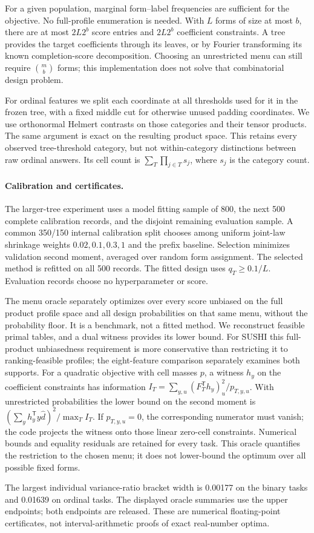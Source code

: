 For a given population, marginal form--label frequencies are sufficient for
the objective. No full-profile enumeration is needed. With $L$ forms of
size at most $b$, there are at most $2L2^b$ score entries and $2L2^b$
coefficient constraints. A tree provides the target coefficients through
its leaves, or by Fourier transforming its known completion-score
decomposition. Choosing an unrestricted menu can still require
$\binom mb$ forms; this implementation does not solve that combinatorial
design problem.

For ordinal features we split each coordinate at all thresholds used for it
in the frozen tree, with a fixed middle cut for otherwise unused padding
coordinates. We use orthonormal Helmert contrasts on those categories and
their tensor products. The same argument is exact on the resulting product
space. This retains every observed tree-threshold category, but not
within-category distinctions between raw ordinal answers. Its cell count
is $\sum_T\prod_{j\in T}s_j$, where $s_j$ is the category count.

\paragraph{Calibration and certificates.}
The larger-tree experiment uses a model fitting sample of
800, the next 500 complete calibration records, and the disjoint remaining
evaluation sample. A common 350/150 internal calibration split chooses
among uniform joint-law shrinkage weights $0.02,0.1,0.3,1$ and the prefix
baseline. Selection minimizes validation second moment, averaged over
random form assignment. The selected method is refitted on all 500 records.
The fitted design uses $q_T\ge0.1/L$. Evaluation records choose no
hyperparameter or score.

The menu oracle separately optimizes over every score unbiased on the full
product profile space and all design probabilities on that same menu,
without the probability floor.
It is a benchmark, not a fitted method. We reconstruct feasible primal
tables, and a dual witness provides its lower bound. For SUSHI this
full-product unbiasedness requirement is more conservative than restricting
it to ranking-feasible profiles; the eight-feature comparison separately
examines both supports. For a quadratic
objective with cell masses $p$, a witness $h_y$ on the coefficient constraints
has information
$I_T=\sum_{y,u}(F_T^{\mathsf T}h_y)_u^2/p_{T,y,u}$.
With unrestricted probabilities the lower bound on the second moment is
$(\sum_y h_y^{\mathsf T}y\widehat d)^2/\max_TI_T$.
If $p_{T,y,u}=0$, the corresponding numerator must vanish; the code projects
the witness onto those linear zero-cell constraints. Numerical bounds and
equality residuals are retained for every task. This oracle quantifies
the restriction to the chosen menu; it does not lower-bound the optimum
over all possible fixed forms.

The largest individual variance-ratio bracket width is 0.00177 on the
binary tasks and 0.01639 on ordinal tasks. The displayed oracle summaries
use the upper endpoints; both endpoints are released. These are numerical
floating-point certificates, not interval-arithmetic proofs of exact
real-number optima.


